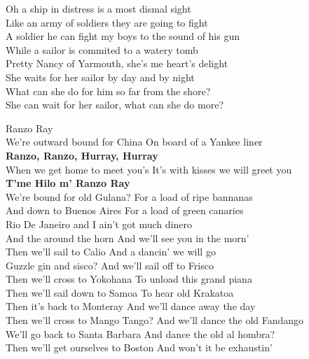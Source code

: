 \documentclass[letterpaper,9pt]{article}
\begin{document}
Oh a ship in distress is a most dismal sight \\
Like an army of soldiers they are going to fight \\
A soldier he can fight my boys to the sound of his gun \\
While a sailor is commited to a watery tomb \\

Pretty Nancy of Yarmouth, she's me heart's delight \\
She waits for her sailor by day and by night \\
What can she do for him so far from the shore? \\
She can wait for her sailor, what can she do more? \\

\newpage
{}
\Huge
Ranzo Ray\\

\LARGE
We’re outward bound for China On board of a Yankee liner \\
\textbf{Ranzo, Ranzo, Hurray, Hurray} \\
When we get home to meet you’s It’s with kisses we will greet you \\
\textbf{T’me Hilo m’ Ranzo Ray} \\

We’re bound for old Gulana? For a load of ripe bannanas \\
And down to Buenos Aires For a load of green canaries \\

Rio De Janeiro and I ain’t got much dinero \\
And the around the horn And we’ll see you in the morn’ \\

Then we’ll sail to Calio And a dancin’ we will go \\
Guzzle gin and sisco? And we’ll sail off to Frisco \\

Then we’ll cross to Yokohana To unload this grand piana \\
Then we’ll sail down to Samoa To hear old Krakatoa \\

Then it’s back to Monteray And we’ll dance away the day \\
Then we’ll cross to Mango Tango? And we’ll dance the old Fandango \\

We’ll go back to Santa Barbara And dance the old al hombra? \\
Then we’ll get ourselves to Boston And won’t it be exhaustin’ \\
\end{document}
